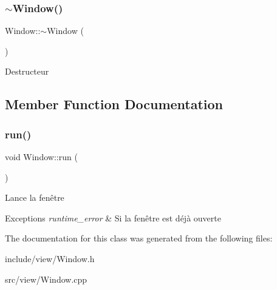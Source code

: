 \subsubsection{\texorpdfstring{$\sim$\+Window()}{~Window()}}
{\footnotesize\ttfamily Window\+::$\sim$\+Window (\begin{DoxyParamCaption}{ }\end{DoxyParamCaption})\hspace{0.3cm}{\ttfamily [default]}}

Destructeur 

\subsection{Member Function Documentation}
\mbox{\label{classWindow_ae137ec42ddc87d666d49661484410091}} 
\subsubsection{\texorpdfstring{run()}{run()}}
{\footnotesize\ttfamily void Window\+::run (\begin{DoxyParamCaption}{ }\end{DoxyParamCaption})}

Lance la fenêtre


\begin{DoxyExceptions}{Exceptions}
{\em runtime\+\_\+error} & Si la fenêtre est déjà ouverte \\
\hline
\end{DoxyExceptions}


The documentation for this class was generated from the following files\+:\begin{DoxyCompactItemize}
\item 
include/view/Window.\+h\item 
src/view/Window.\+cpp\end{DoxyCompactItemize}
